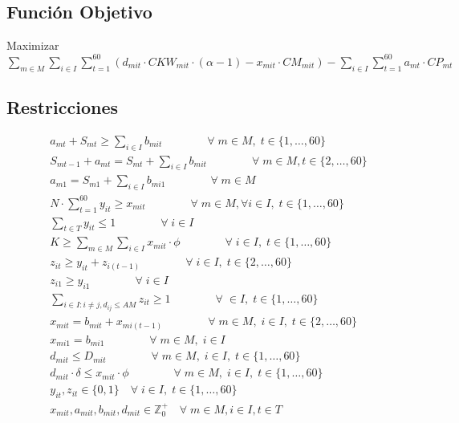\documentclass[letterpaper]{article}
\begin{document}
\begin{flushleft}
	\subsection{Función Objetivo}
	\begin{center}
		Maximizar $\sum_{m \in M}\sum_{i \in I} \sum_{t=1}^{60} (d_{mit} \cdot CKW_{mit} \cdot (\alpha - 1) - x_{mit} \cdot CM_{mit}) - \sum_{i \in I} \sum_{t=1}^{60} a_{mt} \cdot CP_{mt}$
	\end{center}

	\subsection{Restricciones}
	\begin{gather}
		a_{mt} + S_{mt} \geq \sum_{i \in I} b_{mit} \qquad\qquad \forall \; m \in M, \; t \in \{1, \ldots, 60\}\\
		S_{mt-1} + a_{mt} = S_{mt} + \sum_{i \in I} b_{mit} \qquad\qquad \forall \; m \in M, t \in \{2, \ldots, 60\}\\
		a_{m1} = S_{m1} + \sum_{i \in I} b_{mi1}  \qquad\qquad \forall \; m \in M\\
		N \cdot \sum_{t=1}^{60} y_{it} \geq x_{mit} \qquad\qquad \forall \; m \in M, \forall i \in I,\; t \in \{1, \ldots, 60\}\\
		\sum_{t \in T} y_{it} \leq 1 \qquad\qquad \forall \; i \in I\\
		K \geq \sum_{m \in M} \sum_{i \in I} x_{mit} \cdot \phi \qquad\qquad \forall \; i \in I, \; t \in \{1, \ldots, 60\}\\
		z_{it} \geq y_{it} + z_{i(t-1)} \qquad\qquad \forall \; i \in I, \;t \in \{2, \ldots, 60\}\\
		z_{i1} \geq y_{i1} \qquad\qquad \forall \; i \in I\\
		\sum_{i \in I: i \neq j, d_{ij}\leq AM} z_{it} \geq 1 \qquad\qquad \forall \; \in I, \; t \in \{1, \ldots, 60\}\\
		x_{mit} = b_{mit} + x_{mi(t-1)} \qquad\qquad \forall \; m \in M, \; i \in I, \; t \in \{2, \ldots, 60\}\\
		x_{mi1} = b_{mi1} \qquad\qquad \forall \; m \in M, \; i \in I\\
		d_{mit} \leq D_{mit} \qquad\qquad \forall \; m \in M, \; i \in I, \; t \in \{1, \ldots, 60\}\\
		d_{mit} \cdot \delta \leq x_{mit} \cdot \phi \qquad\qquad \forall \; m \in M, \; i \in I, \; t \in \{1, \ldots, 60\}\\
		y_{it}, z_{it} \in \{0, 1\} \quad \forall \; i \in I, \; t \in \{1, \ldots, 60\}\\
		x_{mit}, a_{mit}, b_{mit}, d_{mit} \in \mathbb{Z}^{+}_0 \quad \forall \; m\in M, i\in I, t\in T\\
	\end{gather}


\end{flushleft}
\end{document}
